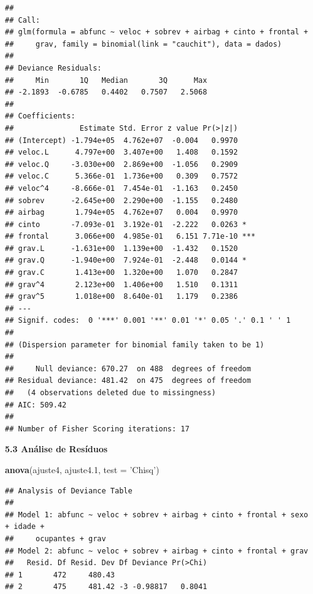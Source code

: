 \documentclass[]{article}
\newenvironment{Shaded}{\begin{snugshade}}{\end{snugshade}}
\newcommand{\KeywordTok}[1]{\textcolor[rgb]{0.13,0.29,0.53}{\textbf{{#1}}}}
\newcommand{\DataTypeTok}[1]{\textcolor[rgb]{0.13,0.29,0.53}{{#1}}}
\newcommand{\FloatTok}[1]{\textcolor[rgb]{0.00,0.00,0.81}{{#1}}}
\newcommand{\StringTok}[1]{\textcolor[rgb]{0.31,0.60,0.02}{{#1}}}
\newcommand{\NormalTok}[1]{{#1}}
\begin{document}
\begin{verbatim}
## 
## Call:
## glm(formula = abfunc ~ veloc + sobrev + airbag + cinto + frontal + 
##     grav, family = binomial(link = "cauchit"), data = dados)
## 
## Deviance Residuals: 
##     Min       1Q   Median       3Q      Max  
## -2.1893  -0.6785   0.4402   0.7507   2.5068  
## 
## Coefficients:
##               Estimate Std. Error z value Pr(>|z|)    
## (Intercept) -1.794e+05  4.762e+07  -0.004   0.9970    
## veloc.L      4.797e+00  3.407e+00   1.408   0.1592    
## veloc.Q     -3.030e+00  2.869e+00  -1.056   0.2909    
## veloc.C      5.366e-01  1.736e+00   0.309   0.7572    
## veloc^4     -8.666e-01  7.454e-01  -1.163   0.2450    
## sobrev      -2.645e+00  2.290e+00  -1.155   0.2480    
## airbag       1.794e+05  4.762e+07   0.004   0.9970    
## cinto       -7.093e-01  3.192e-01  -2.222   0.0263 *  
## frontal      3.066e+00  4.985e-01   6.151 7.71e-10 ***
## grav.L      -1.631e+00  1.139e+00  -1.432   0.1520    
## grav.Q      -1.940e+00  7.924e-01  -2.448   0.0144 *  
## grav.C       1.413e+00  1.320e+00   1.070   0.2847    
## grav^4       2.123e+00  1.406e+00   1.510   0.1311    
## grav^5       1.018e+00  8.640e-01   1.179   0.2386    
## ---
## Signif. codes:  0 '***' 0.001 '**' 0.01 '*' 0.05 '.' 0.1 ' ' 1
## 
## (Dispersion parameter for binomial family taken to be 1)
## 
##     Null deviance: 670.27  on 488  degrees of freedom
## Residual deviance: 481.42  on 475  degrees of freedom
##   (4 observations deleted due to missingness)
## AIC: 509.42
## 
## Number of Fisher Scoring iterations: 17
\end{verbatim}

\textbf{5.3 Análise de Resíduos}

\begin{Shaded}
\begin{Highlighting}[]
\KeywordTok{anova}\NormalTok{(ajuste4, ajuste4}\FloatTok{.1}\NormalTok{, }\DataTypeTok{test =} \StringTok{'Chisq'}\NormalTok{)}
\end{Highlighting}
\end{Shaded}

\begin{verbatim}
## Analysis of Deviance Table
## 
## Model 1: abfunc ~ veloc + sobrev + airbag + cinto + frontal + sexo + idade + 
##     ocupantes + grav
## Model 2: abfunc ~ veloc + sobrev + airbag + cinto + frontal + grav
##   Resid. Df Resid. Dev Df Deviance Pr(>Chi)
## 1       472     480.43                     
## 2       475     481.42 -3 -0.98817   0.8041
\end{verbatim}
\end{document}
